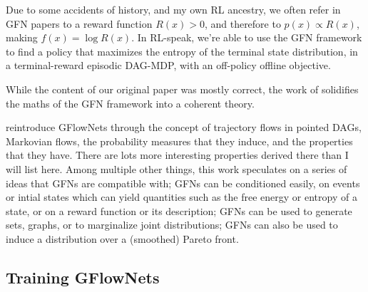 Due to some accidents of history, and my own RL ancestry, we often refer in GFN papers to a reward function $R(x)>0$, and therefore to $p(x)\propto R(x)$, making $f(x) = \log R(x)$. In RL-speak, we're able to use the GFN framework to find a policy that maximizes the entropy of the terminal state distribution, in a terminal-reward episodic DAG-MDP, with an off-policy offline objective.

While the content of our original paper \cite{bengio2021flow} was mostly correct, the work of \citet{bengio2021gflownet} solidifies the maths of the GFN framework into a coherent theory.

\citet{bengio2021gflownet} reintroduce GFlowNets through the concept of trajectory flows in pointed DAGs, Markovian flows, the probability measures that they induce, and the properties that they have. There are lots more interesting properties derived there than I will list here. Among multiple other things, this work speculates on a series of ideas that GFNs are compatible with; GFNs can be conditioned easily, on events or intial states which can yield quantities such as the free energy or entropy of a state, or on a reward function or its description; GFNs can be used to generate sets, graphs, or to marginalize joint distributions; GFNs can also be used to induce a distribution over a (smoothed) Pareto front.

\subsection{Training GFlowNets}

